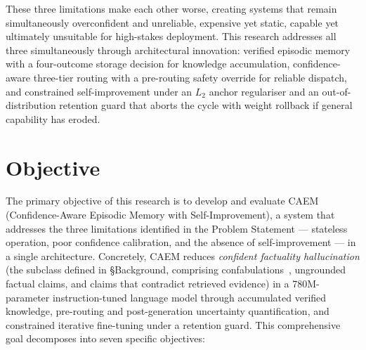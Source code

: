 These three limitations make each other worse, creating systems that remain simultaneously overconfident and unreliable, expensive yet static, capable yet ultimately unsuitable for high-stakes deployment. This research addresses all three simultaneously through architectural innovation: verified episodic memory with a four-outcome storage decision for knowledge accumulation, confidence-aware three-tier routing with a pre-routing safety override for reliable dispatch, and constrained self-improvement under an $L_2$ anchor regulariser and an out-of-distribution retention guard that aborts the cycle with weight rollback if general capability has eroded.

\section{Objective}

The primary objective of this research is to develop and evaluate CAEM (Confidence-Aware Episodic Memory with Self-Improvement), a system that addresses the three limitations identified in the Problem Statement --- stateless operation, poor confidence calibration, and the absence of self-improvement --- in a single architecture. Concretely, CAEM reduces \textit{confident factuality hallucination} (the subclass defined in §Background, comprising confabulations~\cite{farquhar2024semantic}, ungrounded factual claims, and claims that contradict retrieved evidence) in a 780M-parameter instruction-tuned language model through accumulated verified knowledge, pre-routing and post-generation uncertainty quantification, and constrained iterative fine-tuning under a retention guard. This comprehensive goal decomposes into seven specific objectives:

